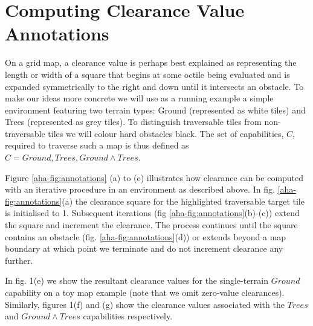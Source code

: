 \section{Computing Clearance Value Annotations}
\label{aha:planningwithannotations}
On a grid map, a clearance value is perhaps best explained as representing the length or width of a square that begins at some octile being evaluated and is expanded symmetrically to the right and down until it intersects an obstacle.     
To make our ideas more concrete we will use as a running example a simple environment featuring two terrain types: Ground (represented as white tiles) and Trees (represented as grey tiles). To distinguish traversable tiles from non-traversable tiles we will colour hard obstacles black. 
The set of capabilities, $C$, required to traverse such a map is thus defined as $C = {{Ground}, {Trees}, {Ground \wedge Trees}}$.
\par \indent
Figure \ref{aha-fig:annotations} (a) to (e) illustrates how clearance can be computed with an iterative procedure in an environment as described above.
In fig. \ref{aha-fig:annotations}(a) the clearance square for the highlighted traversable target tile is initialised to 1. 
Subsequent iterations (fig \ref{aha-fig:annotations}(b)-(c)) extend the square and increment the clearance. 
The process continues until the square contains an obstacle (fig. \ref{aha-fig:annotations}(d)) or extends beyond a map boundary at which point we terminate and do not increment clearance any further.
\par \indent
In fig. 1(e) we show the resultant clearance values for the single-terrain ${Ground}$ capability on a toy map example (note that we omit zero-value clearances).
Similarly, figures 1(f) and (g) show the clearance values associated with the ${Trees}$ and ${Ground \wedge Trees}$ capabilities respectively.  

